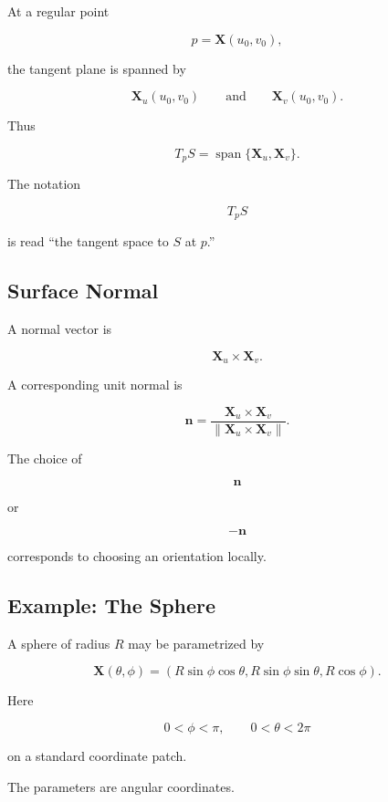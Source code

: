 At a regular point

\[
p=\mathbf{X}(u_0,v_0),
\]

the tangent plane is spanned by

\[
\boxed{
\mathbf{X}_u(u_0,v_0)
\qquad\text{and}\qquad
\mathbf{X}_v(u_0,v_0).
}
\]

Thus

\[
T_pS
=
\operatorname{span}
\{
\mathbf{X}_u,\mathbf{X}_v
\}.
\]

The notation

\[
T_pS
\]

is read ``the tangent space to \(S\) at \(p\).''

\subsection{Surface Normal}
\label{subsec:surface-normal}

A normal vector is

\[
\boxed{
\mathbf{X}_u\times\mathbf{X}_v.
}
\]

A corresponding unit normal is

\[
\boxed{
\mathbf{n}
=
\frac{
\mathbf{X}_u\times\mathbf{X}_v
}{
\|\mathbf{X}_u\times\mathbf{X}_v\|
}.
}
\]

The choice of

\[
\mathbf{n}
\]

or

\[
-\mathbf{n}
\]

corresponds to choosing an orientation locally.

\subsection{Example: The Sphere}
\label{subsec:sphere-parametrization}

A sphere of radius \(R\) may be parametrized by

\[
\boxed{
\mathbf{X}(\theta,\phi)
=
\left(
R\sin\phi\cos\theta,
R\sin\phi\sin\theta,
R\cos\phi
\right).
}
\]

Here

\[
0<\phi<\pi,
\qquad
0<\theta<2\pi
\]

on a standard coordinate patch.

The parameters are angular coordinates.

